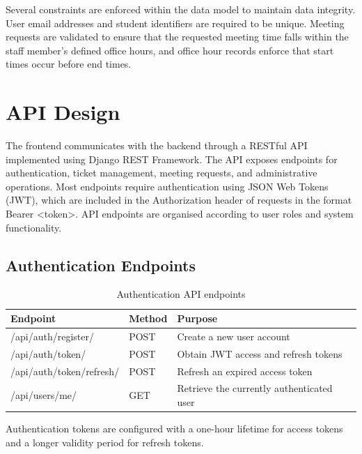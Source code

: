 Several constraints are enforced within the data model to maintain data integrity. User email addresses and student identifiers are required to be unique. Meeting requests are validated to ensure that the requested meeting time falls within the staff member’s defined office hours, and office hour records enforce that start times occur before end times.


\section{API Design}
\label{sec:api-design}
The frontend communicates with the backend through a RESTful API implemented using Django REST Framework. The API exposes endpoints for authentication, ticket management, meeting requests, and administrative operations. Most endpoints require authentication using JSON Web Tokens (JWT), which are included in the Authorization header of requests in the format Bearer <token>. API endpoints are organised according to user roles and system functionality.

\subsection{Authentication Endpoints}
\begin{table}[h]
\centering
\begin{tabular}{|l|l|p{7cm}|}
\hline
\textbf{Endpoint} & \textbf{Method} & \textbf{Purpose} \\
\hline
/api/auth/register/ & POST & Create a new user account \\
/api/auth/token/ & POST & Obtain JWT access and refresh tokens \\
/api/auth/token/refresh/ & POST & Refresh an expired access token \\
/api/users/me/ & GET & Retrieve the currently authenticated user \\
\hline
\end{tabular}
\caption{Authentication API endpoints}
\end{table}
Authentication tokens are configured with a one-hour lifetime for access tokens and a longer validity period for refresh tokens.

